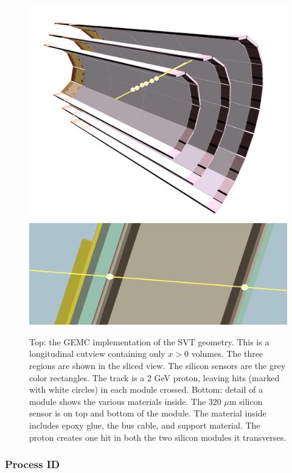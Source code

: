 \begin{figure}
	\centering
	\includegraphics[width=0.99\columnwidth,keepaspectratio]{img/bstGeometry.png}
	\includegraphics[width=0.99\columnwidth,keepaspectratio]{img/bstDetail.png}
	\caption{Top: the GEMC implementation of the SVT geometry. This is a longitudinal cutview containing only $x>0$ volumes.
	         The three regions are shown in the sliced view. The silicon sensors are
             the grey color rectangles. The track is a 2 GeV proton, leaving hits (marked with white circles)
			 in each module crossed. Bottom: detail of a module shows
             the various materials inside. The 320 $\mu$m silicon sensor is on top and bottom of the module.
             The material inside includes epoxy glue, the bus cable, and support material. The proton creates one hit
		     in both the two silicon modules it transverses.}
	\label{fig:bstGeometry}
\end{figure}


\subsubsection{Process ID}

